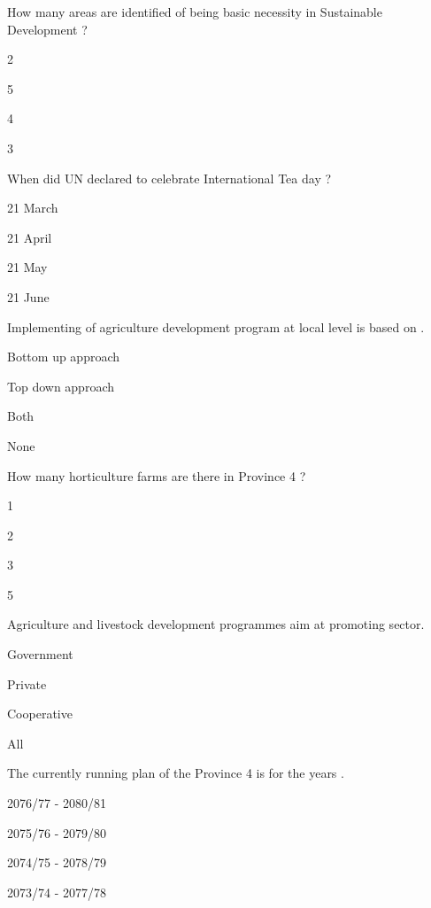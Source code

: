 \begin{questions}
\question How many areas are identified of being basic necessity in Sustainable Development ?
\begin{items}
\item 2
\item 5
\item 4
\item 3
\end{items}

\question When did UN declared to celebrate International Tea day ?
\begin{items}
\item 21 March
\item 21 April
\item 21 May
\item 21 June
\end{items}

\question Implementing of agriculture development program at local level is based on \fillin[][3cm].
\begin{items}
\item* Bottom up approach
\item Top down approach
\item Both
\item None
\end{items}

\question How many horticulture farms are there in Province 4 ?
\begin{items}
\item* 1
\item 2
\item 3
\item 5
\end{items}

\question Agriculture and livestock development programmes aim at promoting \fillin[][3cm] sector.
\begin{items}
\item Government
\item Private
\item* Cooperative
\item All
\end{items}

\question The currently running plan of the Province 4 is for the years \fillin[][3cm].
\begin{items}
\item* 2076/77 - 2080/81
\item 2075/76 - 2079/80
\item 2074/75 - 2078/79
\item 2073/74 - 2077/78
\end{items}


\end{questions}
